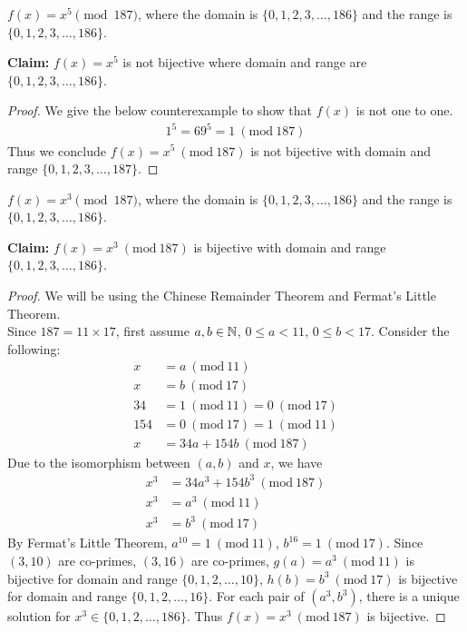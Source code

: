 \documentclass[11pt]{article}
\newcommand{\Mod}[1]{\ (\mathrm{mod}\ #1)}
\begin{document}
\begin{Parts}
    \Part $f(x) = x^5 \pmod{187}$, where the domain is $\{0, 1, 2, 3, \ldots, 186\}$ and the range is $\{0, 1, 2, 3, \ldots, 186\}$.
    \begin{Answer}
        \textbf{Claim:} $f(x)=x^5$ is not bijective where domain and range are $\{0,1,2,3,\ldots,186\}$.
        \begin{proof}
            We give the below counterexample to show that $f(x)$ is not one to one.
            \begin{align*}
                1^5 = 69^5 = 1 \Mod{187}
            \end{align*}
            Thus we conclude $f(x)=x^5 \Mod{187}$ is not bijective with domain and range $\{0,1,2,3,\ldots,187\}$.
        \end{proof}
    \end{Answer}

    \Part $f(x) = x^3 \pmod{187}$, where the domain is $\{0, 1, 2, 3, \ldots, 186\}$ and the range is $\{0, 1, 2, 3, \ldots, 186\}$.
    \begin{Answer}
        \textbf{Claim:} $f(x)=x^3 \Mod{187}$ is bijective with domain and range $\{0,1,2,3,\ldots,186\}$. 
        \begin{proof}
            We will be using the Chinese Remainder Theorem and Fermat's Little Theorem. \\
            Since $187=11\times 17$, first assume $a,b \in \mathbb{N}$, $0 \leq a < 11$, $0 \leq b < 17$. Consider the following: 
            \begin{align*}
                x   &= a \Mod{11} \\
                x   &= b \Mod{17} \\
                34  &= 1 \Mod{11} = 0 \Mod{17} \\
                154 &= 0 \Mod{17} = 1 \Mod{11} \\
                x   &= 34a + 154b \Mod{187}
            \end{align*}
            Due to the isomorphism between $(a,b)$ and $x$, we have 
            \begin{align*}
                x^3 &= 34a^3 + 154b^3 \Mod{187} \\
                x^3 &= a^3 \Mod{11} \\
                x^3 &= b^3 \Mod{17}
            \end{align*}
            By Fermat's Little Theorem, $a^{10}=1 \Mod{11}$, $b^{16}=1 \Mod{17}$. Since $(3,10)$ are co-primes, $(3,16)$ are co-primes,
            $g(a)=a^3\Mod{11}$ is bijective for domain and range $\{0,1,2,\ldots,10\}$, $h(b)=b^3\Mod{17}$ is bijective for domain and range $\{0,1,2,\ldots,16\}$. 
            For each pair of $(a^3,b^3)$, there is a unique solution for $x^3 \in \{0,1,2,\ldots,186\}$. Thus $f(x)=x^3 \Mod{187}$ is bijective.
        \end{proof}
    \end{Answer}
\end{Parts}
\end{document}
